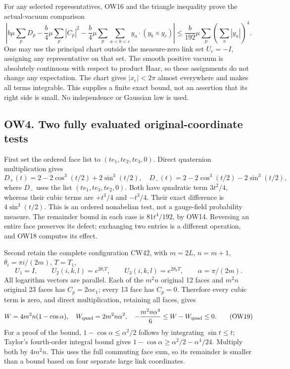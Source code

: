 \documentclass[11pt]{article}
\begin{document}
For any selected representatives, OW16 and the triangle inequality prove the actual-vacuum comparison
\[
 \left|b\mu\sum_pD_p-
 \frac b4\mu\sum_p|C_p|^2-
 \frac b4\mu\sum_p\sum_{a<b<c}y_a\cdot(y_b\times y_c)\right|
 \le\frac b{192}\mu\sum_p\left(\sum_a|y_a|\right)^4.    \tag{OW17}
\]
One may use the principal chart outside the measure-zero link set \(U_e=-I\), assigning any representative on that set. The smooth positive vacuum is absolutely continuous with respect to product Haar, so these assignments do not change any expectation. The chart gives \(|x_e|<2\pi\) almost everywhere and makes all terms integrable. This supplies a finite exact bound, not an assertion that its right side is small. No independence or Gaussian law is used.

\subsection*{OW4. Two fully evaluated original-coordinate tests}

First set the ordered face list to \((t e_1,t e_2,t e_3,0)\). Direct quaternion multiplication gives
\[
 D_+(t)=2-2\cos^3(t/2)+2\sin^3(t/2),\quad
 D_-(t)=2-2\cos^3(t/2)-2\sin^3(t/2),                    \tag{OW18}
\]
where \(D_-\) uses the list \((t e_1,t e_3,t e_2,0)\). Both have quadratic term \(3t^2/4\), whereas their cubic terms are \(+t^3/4\) and \(-t^3/4\). Their exact difference is \(4\sin^3(t/2)\). This is an ordered nonabelian test, not a gauge-field probability measure. The remainder bound in each case is \(81t^4/192\), by OW14. Reversing an entire face preserves its defect; exchanging two entries is a different operation, and OW18 computes its effect.

Second retain the complete configuration CW42, with \(m=2L\), \(n=m+1\), \(\theta_i=\pi i/(2m)\), \(T=T_1\),
\[
 U_1=I,\qquad U_2(i,k,l)=e^{2\theta_iT},\qquad
 U_3(i,k,l)=e^{2\theta_kT},\qquad \alpha=\pi/(2m).
\]
All logarithm vectors are parallel. Each of the \(m^2n\) original 12 faces and \(m^2n\) original 23 faces has \(C_p=2\alpha e_1\); every 13 face has \(C_p=0\). Therefore every cubic term is zero, and direct multiplication, retaining all faces, gives
\[
 W=4m^2n(1-\cos\alpha),\quad
 W_{\rm quad}=2m^2n\alpha^2,\quad
 -\frac{m^2n\alpha^4}{6}\le W-W_{\rm quad}\le0.          \tag{OW19}
\]
For a proof of the bound, \(1-\cos\alpha\le\alpha^2/2\) follows by integrating \(\sin t\le t\); Taylor's fourth-order integral bound gives \(1-\cos\alpha\ge\alpha^2/2-\alpha^4/24\). Multiply both by \(4m^2n\). This uses the full commuting face sum, so its remainder is smaller than a bound based on four separate large link coordinates.
\end{document}
